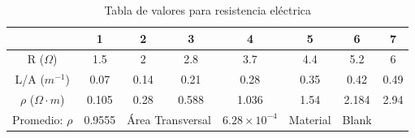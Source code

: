 \documentclass[10pt]{article}
\begin{document}
\begin{table}[H]
	\centering
	\caption{Tabla de valores para resistencia eléctrica}
	\label{tabla-resistencia 2da Medicion}
	\begin{tabular}{cccccccc}
		\toprule
		                          & 1      & 2                                    & 3                     & 4        & 5      & 6     & 7    \\
		\midrule
		R ($\Omega$)              & 1.5    & 2                                    & 2.8                   & 3.7      & 4.4    & 5.2   & 6    \\
		L/A ($m^{-1}$)            & 0.07   & 0.14                                 & 0.21                  & 0.28     & 0.35   & 0.42  & 0.49 \\
		$\rho$ ($\Omega \cdot m$) & 0.105  & 0.28                                 & 0.588                 & 1.036    & 1.54   & 2.184 & 2.94 \\
		Promedio: $\rho$          & 0.9555 & \multicolumn{2}{c}{Área Transversal} & $6.28 \times 10^{-4}$ & Material & Blank                \\
		\bottomrule
	\end{tabular}
\end{table}

\end{document}
